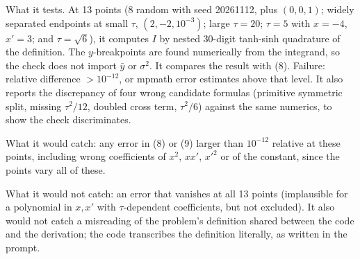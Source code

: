 \documentclass[11pt,a4paper]{article}
\begin{document}
What it tests. At 13 points (\(8\) random with seed 20261112, plus
\((0,0,1)\); widely separated endpoints at small \(\tau\),
\((2,-2,10^{-3})\); large \(\tau=20\); \(\tau=5\) with \(x=-4\),
\(x'=3\); and \(\tau=\sqrt6\)), it computes \(I\) by nested 30-digit
tanh-sinh quadrature of the definition. The \(y\)-breakpoints are found
numerically from the integrand, so the check does not import \(\bar y\)
or \(\sigma^2\). It compares the result with (8). Failure: relative
difference \(>10^{-12}\), or mpmath error estimates above that level. It
also reports the discrepancy of four wrong candidate formulas (primitive
symmetric split, missing \(\tau^2/12\), doubled cross term,
\(\tau^2/6\)) against the same numerics, to show the check
discriminates.

What it would catch: any error in (8) or (9) larger than \(10^{-12}\)
relative at these points, including wrong coefficients of \(x^2\),
\(xx'\), \(x'^2\) or of the constant, since the points vary all of
these.

What it would not catch: an error that vanishes at all 13 points
(implausible for a polynomial in \(x,x'\) with \(\tau\)-dependent
coefficients, but not excluded). It also would not catch a misreading of
the problem's definition shared between the code and the derivation; the
code transcribes the definition literally, as written in the prompt.
\end{document}
